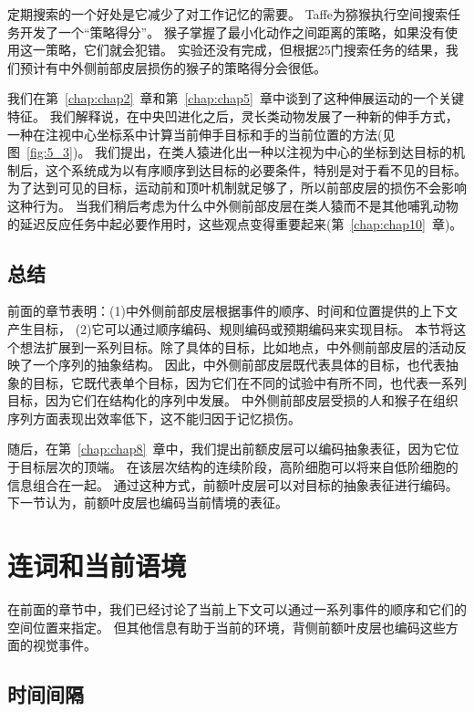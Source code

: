 定期搜索的一个好处是它减少了对工作记忆的需要。
Taffe\cite{taffe2011rhesus}为猕猴执行空间搜索任务开发了一个“策略得分”。
猴子掌握了最小化动作之间距离的策略，如果没有使用这一策略，它们就会犯错。
实验还没有完成，但根据25门搜索任务的结果，我们预计有中外侧前部皮层损伤的猴子的策略得分会很低。


我们在第~\ref{chap:chap2}~章和第~\ref{chap:chap5}~章中谈到了这种伸展运动的一个关键特征。
我们解释说，在中央凹进化之后，灵长类动物发展了一种新的伸手方式，一种在注视中心坐标系中计算当前伸手目标和手的当前位置的方法(见图~\ref{fig:5_3})。
我们提出，在类人猿进化出一种以注视为中心的坐标到达目标的机制后，这个系统成为以有序顺序到达目标的必要条件，特别是对于看不见的目标。
为了达到可见的目标，运动前和顶叶机制就足够了，所以前部皮层的损伤不会影响这种行为。
当我们稍后考虑为什么中外侧前部皮层在类人猿而不是其他哺乳动物的延迟反应任务中起必要作用时，这些观点变得重要起来(第~\ref{chap:chap10}~章)。



\subsection{总结}

前面的章节表明：(1)中外侧前部皮层根据事件的顺序、时间和位置提供的上下文产生目标，
(2)它可以通过顺序编码、规则编码或预期编码来实现目标。
本节将这个想法扩展到一系列目标。除了具体的目标，比如地点，中外侧前部皮层的活动反映了一个序列的抽象结构。
因此，中外侧前部皮层既代表具体的目标，也代表抽象的目标，它既代表单个目标，因为它们在不同的试验中有所不同，也代表一系列目标，因为它们在结构化的序列中发展。
中外侧前部皮层受损的人和猴子在组织序列方面表现出效率低下，这不能归因于记忆损伤。


随后，在第~\ref{chap:chap8}~章中，我们提出前额皮层可以编码抽象表征，因为它位于目标层次的顶端。
在该层次结构的连续阶段，高阶细胞可以将来自低阶细胞的信息组合在一起。
通过这种方式，前额叶皮层可以对目标的抽象表征进行编码。
下一节认为，前额叶皮层也编码当前情境的表征。



\section{连词和当前语境}

在前面的章节中，我们已经讨论了当前上下文可以通过一系列事件的顺序和它们的空间位置来指定。
但其他信息有助于当前的环境，背侧前额叶皮层也编码这些方面的视觉事件。


\subsection{时间间隔}

